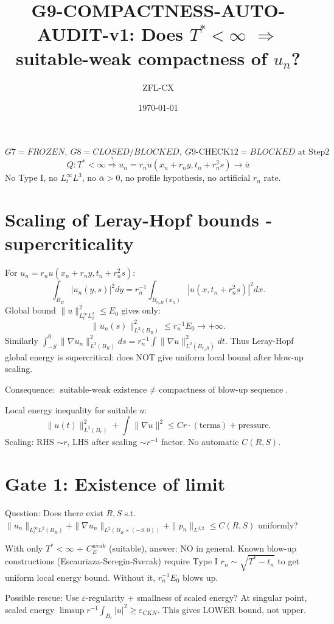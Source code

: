 \documentclass[11pt]{article}
\begin{document}
\title{G9-COMPACTNESS-AUTO-AUDIT-v1: Does $T^*<\infty$ $\Rightarrow$ suitable-weak compactness of $u_n$?}
\author{ZFL-CX}\date{\today}\maketitle

\[
\boxed{G7=FROZEN,\ G8=CLOSED/BLOCKED,\ G9\text{-CHECK12}=BLOCKED\text{ at Step2}}
\]
\[
\boxed{Q: T^*<\infty \stackrel{?}{\Rightarrow} u_n=r_nu(x_n+r_ny,t_n+r_n^2s)\to\bar u}
\]
No Type I, no $L^\infty_tL^3$, no $\bar\alpha>0$, no profile hypothesis, no artificial $r_n$ rate.

\section{Scaling of Leray-Hopf bounds - supercriticality}
For $u_n=r_n u(x_n+r_ny,t_n+r_n^2s)$:
\[
\int_{B_R}|u_n(y,s)|^2dy = r_n^{-1}\int_{B_{r_nR}(x_n)}|u(x,t_n+r_n^2s)|^2dx.
\]
Global bound $\|u\|_{L^\infty_tL^2_x}^2\le E_0$ gives only:
\[
\|u_n(s)\|_{L^2(B_R)}^2\le r_n^{-1}E_0\to+\infty.
\]
Similarly $\int_{-S}^0\|\nabla u_n\|_{L^2(B_R)}^2ds = r_n^{-1}\int\|\nabla u\|_{L^2(B_{r_nR})}^2dt$.
Thus Leray-Hopf global energy is supercritical: does NOT give uniform local bound after blow-up scaling.

Consequence: $\boxed{\text{suitable-weak existence }\neq\text{ compactness of blow-up sequence}}$.

Local energy inequality for suitable $u$:
\[
\|u(t)\|_{L^2(B_r)}^2+\int\|\nabla u\|^2 \le C r \cdot (\text{terms}) + \text{pressure}.
\]
Scaling: RHS $\sim r$, LHS after scaling $\sim r^{-1}$ factor. No automatic $C(R,S)$.

\section{Gate 1: Existence of limit}
Question: Does there exist $R,S$ s.t. $\|u_n\|_{L^\infty_tL^2(B_R)}+\|\nabla u_n\|_{L^2(B_R\times(-S,0))}+ \|p_n\|_{L^{3/2}}\le C(R,S)$ uniformly?

With only $T^*<\infty$ + $C_E^{weak}$ (suitable), answer: NO in general. Known blow-up constructions (Escauriaza-Seregin-Sverak) require Type I $r_n\sim\sqrt{T^*-t_n}$ to get uniform local energy bound. Without it, $r_n^{-1}E_0$ blows up.

Possible rescue: Use $\varepsilon$-regularity + smallness of scaled energy? At singular point, scaled energy $\limsup r^{-1}\int_{B_r}|u|^2 \ge \varepsilon_{CKN}$. This gives LOWER bound, not upper.
\end{document}
